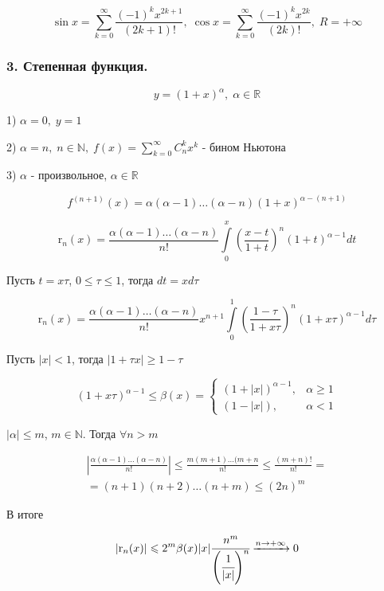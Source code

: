 \documentclass[a4paper,12pt]{article} %
\newcommand{\ryad}{\sum\limits^{\infty}_{k = 0}}
\begin{document}
$$ 
\sin x = \ryad \frac{(-1)^k x^{2k + 1}}{(2k + 1)!}, \; \cos x = \ryad \frac{(-1)^k x^{2k}}{(2k)!}, \;R = + \infty
$$


\subsubsection*{3. Степенная функция.}

$$y = (1 + x)^{\alpha}, \; \alpha \in \mathbb{R}$$


1) $\alpha = 0, \; y = 1$

2) $\alpha = n, \; n \in \mathbb{N}, \; f(x) = \ryad C^k_n x^k$ - бином Ньютона

3) $\alpha$ - произвольное, $\alpha \in \mathbb{R}$

$$ 
	f^{(n + 1)}(x) = \alpha (\alpha - 1) \ldots (\alpha - n) (1 + x)^{\alpha - (n + 1)} $$

$$
\mathrm{r}_n(x) = \frac{\alpha(\alpha - 1) \ldots (\alpha - n)}{n!} \int\limits_0^x \left(\frac{x - t}{1 + t} \right)^n (1 + t)^{\alpha - 1} dt
$$

Пусть $t = x \tau$, $0 \leqslant \tau \leqslant 1$, тогда $dt = x d \tau$

$$
\mathrm{r}_n(x) =  \frac{\alpha(\alpha - 1) \ldots (\alpha - n)}{n!} x^{n + 1} \int\limits_0^1 \left( \frac{1 - \tau}{1 + x\tau} \right)^n ( 1 + x \tau)^{\alpha - 1} d \tau
$$

Пусть $|x| < 1$, тогда $|1 + \tau x| \geqslant 1 - \tau$



\begin{equation*}
(1+x \tau)^{\alpha-1} \leqslant \beta(x)=
 \begin{cases}
   (1+|x|)^{\alpha-1}, & \alpha \geq 1 \\
   (1-|x|), & \alpha<1
 \end{cases}
\end{equation*}

$ | \alpha | \leqslant m $, $m \in \mathbb{N}$. Тогда $\forall n > m$

\begin{multline*}
\left| \frac{\alpha(\alpha - 1) \ldots (\alpha - n)}{n!} \right| \leqslant \frac{m (m + 1) \ldots (m + n}{n!} \leqslant \frac{(m + n)!}{n!} = \\
= (n + 1)(n + 2) \ldots (n + m)\leqslant (2n)^m
\end{multline*}

В итоге

$$ 
\left| \mathrm{r}_n (x) \right| \leqslant 2^m \beta (x) |x| \cfrac{n^m}{\left(\cfrac{1}{|x|}\right)^n} \xrightarrow{n \rightarrow + \infty} 0
$$
\end{document}
